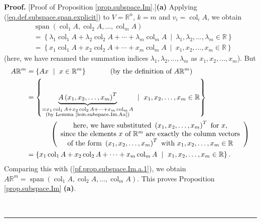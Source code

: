 \documentclass[numbers=enddot,12pt,final,onecolumn,notitlepage]{scrartcl}%
\theoremstyle{definition}
\newenvironment{proof}[1][Proof]{\noindent\textbf{#1.} }{\ \rule{0.5em}{0.5em}}
\begin{document}
\begin{proof}
[Proof of Proposition \ref{prop.subspace.Im}.]\textbf{(a)} Applying
(\ref{eq.def.subspace.span.explicit}) to $V=\mathbb{R}^{n}$, $k=m$ and
$v_{i}=\operatorname*{col}\nolimits_{i}A$, we obtain%
\begin{align}
&  \operatorname{span}\left(  \operatorname*{col}\nolimits_{1}%
A,\operatorname*{col}\nolimits_{2}A,\ldots,\operatorname*{col}\nolimits_{m}%
A\right) \nonumber\\
&  =\left\{  \lambda_{1}\operatorname*{col}\nolimits_{1}A+\lambda
_{2}\operatorname*{col}\nolimits_{2}A+\cdots+\lambda_{m}\operatorname*{col}%
\nolimits_{m}A\ \mid\ \lambda_{1},\lambda_{2},\ldots,\lambda_{m}\in
\mathbb{R}\right\} \nonumber\\
&  =\left\{  x_{1}\operatorname*{col}\nolimits_{1}A+x_{2}\operatorname*{col}%
\nolimits_{2}A+\cdots+x_{m}\operatorname*{col}\nolimits_{m}A\ \mid
\ x_{1},x_{2},\ldots,x_{m}\in\mathbb{R}\right\}
\label{pf.prop.subspace.Im.a.1}%
\end{align}
(here, we have renamed the summation indices $\lambda_{1},\lambda_{2}%
,\ldots,\lambda_{m}$ as $x_{1},x_{2},\ldots,x_{m}$). But%
\begin{align*}
A\mathbb{R}^{m}  &  =\left\{  Ax\ \mid\ x\in\mathbb{R}^{m}\right\}
\ \ \ \ \ \ \ \ \ \ \left(  \text{by the definition of }A\mathbb{R}^{m}\right)
\\
&  =\left\{  \underbrace{A\left(  x_{1},x_{2},\ldots,x_{m}\right)  ^{T}%
}_{\substack{=x_{1}\operatorname*{col}\nolimits_{1}A+x_{2}\operatorname*{col}%
\nolimits_{2}A+\cdots+x_{m}\operatorname*{col}\nolimits_{m}A\\\text{(by Lemma
\ref{lem.subspace.Im.Ax})}}}\ \mid\ x_{1},x_{2},\ldots,x_{m}\in\mathbb{R}%
\right\} \\
&  \ \ \ \ \ \ \ \ \ \ \left(
\begin{array}
[c]{c}%
\text{here, we have substituted }\left(  x_{1},x_{2},\ldots,x_{m}\right)
^{T}\text{ for }x\text{,}\\
\text{since the elements }x\text{ of }\mathbb{R}^{m}\text{ are exactly the
column vectors}\\
\text{of the form }\left(  x_{1},x_{2},\ldots,x_{m}\right)  ^{T}\text{ with
}x_{1},x_{2},\ldots,x_{m}\in\mathbb{R}%
\end{array}
\right) \\
&  =\left\{  x_{1}\operatorname*{col}\nolimits_{1}A+x_{2}\operatorname*{col}%
\nolimits_{2}A+\cdots+x_{m}\operatorname*{col}\nolimits_{m}A\ \mid
\ x_{1},x_{2},\ldots,x_{m}\in\mathbb{R}\right\}  .
\end{align*}
Comparing this with (\ref{pf.prop.subspace.Im.a.1}), we obtain $A\mathbb{R}%
^{m}=\operatorname{span}\left(  \operatorname*{col}\nolimits_{1}%
A,\operatorname*{col}\nolimits_{2}A,\ldots,\operatorname*{col}\nolimits_{m}%
A\right)  $. This proves Proposition \ref{prop.subspace.Im} \textbf{(a)}.


\end{proof}
\end{document}
